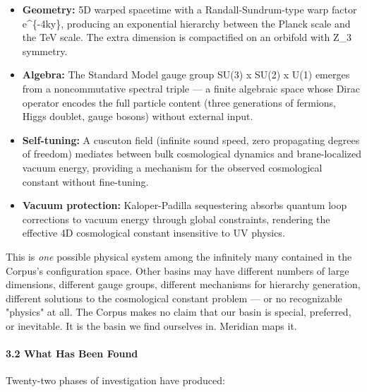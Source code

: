 \begin{itemize}[nosep,leftmargin=*]
  \item \textbf{Geometry:} 5D warped spacetime with a Randall-Sundrum-type warp factor e\textasciicircum{}\{-4ky\}, producing an exponential hierarchy between the Planck scale and the TeV scale. The extra dimension is compactified on an orbifold with Z\_3 symmetry.
  \item \textbf{Algebra:} The Standard Model gauge group SU(3) x SU(2) x U(1) emerges from a noncommutative spectral triple — a finite algebraic space whose Dirac operator encodes the full particle content (three generations of fermions, Higgs doublet, gauge bosons) without external input.
  \item \textbf{Self-tuning:} A cuscuton field (infinite sound speed, zero propagating degrees of freedom) mediates between bulk cosmological dynamics and brane-localized vacuum energy, providing a mechanism for the observed cosmological constant without fine-tuning.
  \item \textbf{Vacuum protection:} Kaloper-Padilla sequestering absorbs quantum loop corrections to vacuum energy through global constraints, rendering the effective 4D cosmological constant insensitive to UV physics.
\end{itemize}


This is \textit{one} possible physical system among the infinitely many contained in the Corpus's configuration space. Other basins may have different numbers of large dimensions, different gauge groups, different mechanisms for hierarchy generation, different solutions to the cosmological constant problem — or no recognizable "physics" at all. The Corpus makes no claim that our basin is special, preferred, or inevitable. It is the basin we find ourselves in. Meridian maps it.


\paragraph*{3.2 What Has Been Found}


Twenty-two phases of investigation have produced:



